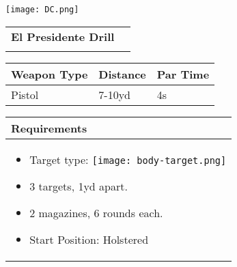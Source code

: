 \documentclass[../Cover.tex]{subfiles}
\begin{document}
	\begin{minipage}[t][0.1\textheight][t]{0.1\textwidth} 
		\texttt{[image: DC.png]}
	\end{minipage}
	\hfill
	\begin{minipage}[t][0.2\textheight][t]{0.8\textwidth}
		\begin{tabular}{ p{} l  }			
			\textbf{El Presidente Drill} \\
			\\[0.09\textheight]
		\end{tabular}
		\quad
		\begin{tabular}{ | p{} | p{} | p{} |}
			\hline
			\tiny Weapon Type & \tiny Distance & \tiny Par Time\\ 
			\hline
			\tiny Pistol & \tiny 7-10yd& \tiny 4s \\ %
			\hline
		\end{tabular}
	\end{minipage}
	\begin{tabular}{p{}}
		\small Requirements \\
		\hline
		\tiny \begin{itemize} %
			\item Target type: \texttt{[image: body-target.png]}
			\item 3 targets, 1yd apart.
			\item 2 magazines, 6 rounds each.
			\item Start Position: Holstered
		\end{itemize}				
		\\[0.6\textheight]
	\end{tabular}
\end{document}

